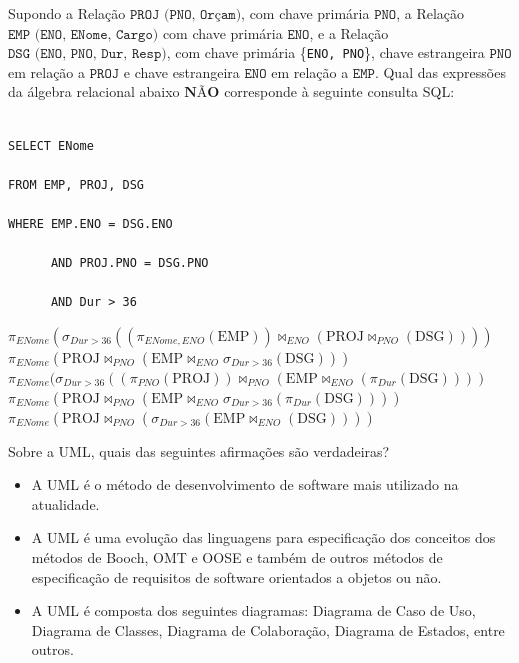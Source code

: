 \documentclass[12pt, addpoints]{exam}
\begin{document}
\begin{questions}
\question

Supondo a Relação $\texttt{PROJ (PNO, Orçam)}$, com chave primária $\texttt{PNO}$, a Relação $\texttt{EMP (ENO, ENome, Cargo)}$ com chave primária $\texttt{ENO}$, e a Relação $\texttt{DSG (ENO, PNO, Dur, Resp)}$, com chave primária \{\texttt{ENO, PNO}\}, chave estrangeira $\texttt{PNO}$ em relação a $\texttt{PROJ}$ e chave estrangeira $\texttt{ENO}$ em relação a $\texttt{EMP}$. Qual das expressões da álgebra relacional abaixo $\textbf{NÃO}$ corresponde à seguinte consulta SQL:



\begin{verbatim}

SELECT ENome

FROM EMP, PROJ, DSG

WHERE EMP.ENO = DSG.ENO

      AND PROJ.PNO = DSG.PNO

      AND Dur > 36

\end{verbatim}
\begin{choices}
\choice \( \pi_{ENome} (\sigma_{Dur > 36} ((\pi_{ENome, ENO} (\text{EMP})) \Join_{ENO} (\text{PROJ} \Join_{PNO} (\text{DSG})))) \)
\choice \( \pi_{ENome} (\text{PROJ} \Join_{PNO} (\text{EMP} \Join_{ENO} \sigma_{Dur > 36} (\text{DSG}))) \)
\choice \( \pi_{ENome} (\sigma_{Dur > 36} ((\pi_{PNO} (\text{PROJ})) \Join_{PNO} (\text{EMP} \Join_{ENO} (\pi_{Dur} (\text{DSG})))) \)
\choice \( \pi_{ENome} (\text{PROJ} \Join_{PNO} (\text{EMP} \Join_{ENO} \sigma_{Dur > 36} (\pi_{Dur} (\text{DSG})))) \)
\choice \( \pi_{ENome} (\text{PROJ} \Join_{PNO} (\sigma_{Dur > 36} (\text{EMP} \Join_{ENO} (\text{DSG})))) \)
\end{choices}

\question

Sobre a UML, quais das seguintes afirmações são verdadeiras?



\begin{itemize}

    \item[I)] A UML é o método de desenvolvimento de software mais utilizado na atualidade.

    \item[II)] A UML é uma evolução das linguagens para especificação dos conceitos dos métodos de Booch, OMT e OOSE e também de outros métodos de especificação de requisitos de software orientados a objetos ou não.

    \item[III)] A UML é composta dos seguintes diagramas: Diagrama de Caso de Uso, Diagrama de Classes, Diagrama de Colaboração, Diagrama de Estados, entre outros.


\end{itemize}
\end{questions}
\end{document}
